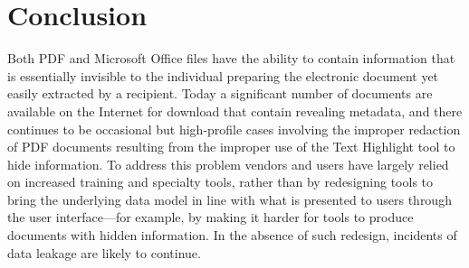 \documentclass{article}
\begin{document}
\section{Conclusion}

Both PDF and Microsoft Office
files have the ability to contain information that is  essentially invisible to the individual preparing the
electronic document yet easily extracted by a recipient. Today a significant number of documents are available on the Internet
for download that contain revealing metadata, and there continues to
be occasional but high-profile cases involving the improper redaction
of PDF documents resulting from the improper use of the Text Highlight
tool to hide information. To address this problem vendors and users
have largely relied on increased training and specialty tools, rather
than by redesigning tools to bring the underlying data model in line
with what is presented to users through the user interface---for
example, by making it harder for tools to produce documents with
hidden information. In the absence of such redesign, incidents of data
leakage are likely to continue.


% 
\end{document}
